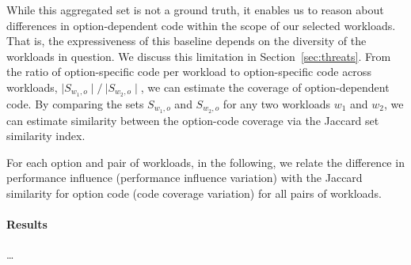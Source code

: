 While this aggregated set is not a ground truth, it enables us to reason about differences in option-dependent code within the scope of our selected workloads. That is, the expressiveness of this baseline depends on the diversity of the workloads in question. We discuss this limitation in Section~\ref{sec:threats}. From the ratio of option-specific code per workload to option-specific code across workloads, $\mid S_{w_1, o}\mid/~{\mid S_{w_2, o}\mid}$, we can estimate the coverage of option-dependent code. By comparing the sets $S_{w_1, o}$ and $S_{w_2, o}$ for any two workloads $w_1$ and $w_2$, we can estimate similarity between the option-code coverage via the Jaccard set similarity index. 

For each option and pair of workloads, in the following, we relate the difference in performance influence (performance influence variation) with the Jaccard similarity for option code (code coverage variation) for all pairs of workloads.


\paragraph*{Results}
{\color{red}\ldots}


